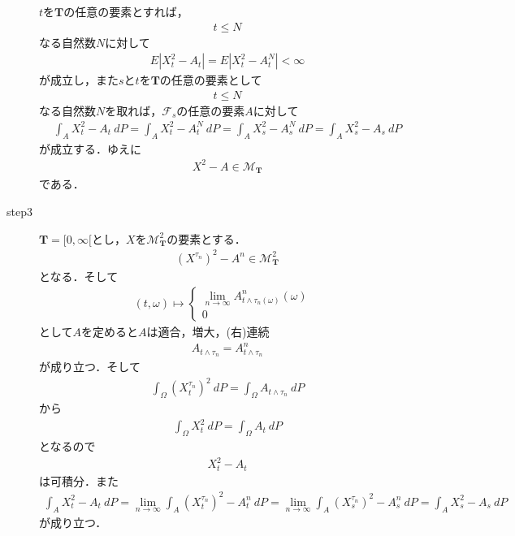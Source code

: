 \begin{sketch}
\begin{description}
				$t$を$\mathbf{T}$の任意の要素とすれば，
				\begin{align}
					t \leq N
				\end{align}
				なる自然数$N$に対して
				\begin{align}
					E\left|X^2_t - A_t\right| = E\left|X^2_t - A^N_t\right| < \infty
				\end{align}
				が成立し，また$s$と$t$を$\mathbf{T}$の任意の要素として
				\begin{align}
					t \leq N
				\end{align}
				なる自然数$N$を取れば，$\mathscr{F}_s$の任意の要素$A$に対して
				\begin{align}
					\int_A X^2_t - A_t\ dP
					= \int_A X^2_t - A^N_t\ dP
					= \int_A X^2_s - A^N_s\ dP
					= \int_A X^2_s - A_s\ dP
				\end{align}
				が成立する．ゆえに
				\begin{align}
					X^2 - A \in \mathscr{M}_{\mathbf{T}}
				\end{align}
				である．
				
			\item[step3]
				$\mathbf{T}=[0,\infty[$とし，$X$を$\mathscr{M}^2_{\mathbf{T}}$の要素とする．
				\begin{align}
					\left(X^{\tau_n}\right)^2 - A^n \in \mathscr{M}^2_{\mathbf{T}}
				\end{align}
				となる．そして
				\begin{align}
					(t,\omega) \longmapsto
					\begin{cases}
						\lim_{n \to \infty} A^n_{t \wedge \tau_n(\omega)}(\omega) & \\
						0
					\end{cases}
				\end{align}
				として$A$を定めると$A$は適合，増大，(右)連続
				\begin{align}
					A_{t \wedge \tau_n} = A^n_{t \wedge \tau_n}
				\end{align}
				が成り立つ．そして
				\begin{align}
					\int_\Omega \left(X^{\tau_n}_t\right)^2\ dP = \int_\Omega A_{t \wedge \tau_n}\ dP
				\end{align}
				から
				\begin{align}
					\int_\Omega X_t^2\ dP = \int_\Omega A_t\ dP
				\end{align}
				となるので
				\begin{align}
					X_t^2 - A_t
				\end{align}
				は可積分．また
				\begin{align}
					\int_A X_t^2 - A_t\ dP
					= \lim_{n \to \infty} \int_A \left(X^{\tau_n}_t\right)^2 - A^n_t\ dP
					= \lim_{n \to \infty} \int_A \left(X^{\tau_n}_s\right)^2 - A^n_s\ dP
					= \int_A X_s^2 - A_s\ dP
				\end{align}
				が成り立つ．
				

\end{description}
\end{sketch}
